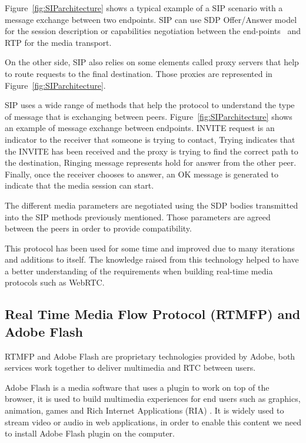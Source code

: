 Figure~\ref{fig:SIParchitecture} shows a typical example of a SIP scenario with a message exchange between two endpoints. SIP can use SDP Offer/Answer model for the session description or capabilities negotiation between the end-points~\cite{sdpIETF} and RTP for the media transport.

On the other side, SIP also relies on some elements called proxy servers that help to route requests to the final destination. Those proxies are represented in Figure~\ref{fig:SIParchitecture}.

SIP uses a wide range of methods that help the protocol to understand the type of message that is exchanging between peers. Figure~\ref{fig:SIParchitecture} shows an example of message exchange between endpoints. INVITE request is an indicator to the receiver that someone is trying to contact, Trying indicates that the INVITE has been received and the proxy is trying to find the correct path to the destination, Ringing message represents hold for answer from the other peer. Finally, once the receiver chooses to answer, an OK message is generated to indicate that the media session can start. 

The different media parameters are negotiated using the SDP bodies transmitted into the SIP methods previously mentioned. Those parameters are agreed between the peers in order to provide compatibility.

This protocol has been used for some time and improved due to many iterations and additions to itself. The knowledge raised from this technology helped to have a better understanding of the requirements when building real-time media protocols such as WebRTC.

\subsection{Real Time Media Flow Protocol (RTMFP) and Adobe Flash}

RTMFP   and Adobe Flash are proprietary technologies provided by Adobe, both services work together to deliver multimedia and RTC between users.

Adobe Flash is a media software that uses a plugin to work on top of the browser, it is used to build multimedia experiences for end users such as graphics, animation, games and Rich Internet Applications (RIA) . It is widely used to stream video or audio in web applications, in order to enable this content we need to install Adobe Flash plugin on the computer. 

